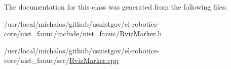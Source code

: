 The documentation for this class was generated from the following files\-:\begin{DoxyCompactItemize}
\item 
/usr/local/michalos/github/usnistgov/el-\/robotics-\/core/nist\-\_\-fanuc/include/nist\-\_\-fanuc/\hyperlink{RvizMarker_8h}{Rviz\-Marker.\-h}\item 
/usr/local/michalos/github/usnistgov/el-\/robotics-\/core/nist\-\_\-fanuc/src/\hyperlink{RvizMarker_8cpp}{Rviz\-Marker.\-cpp}\end{DoxyCompactItemize}
